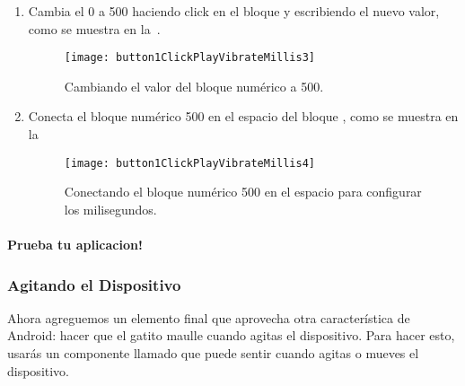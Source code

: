 \begin{enumerate}
\item Cambia el 0 a 500 haciendo click en el bloque y escribiendo el
  nuevo valor, como se muestra en
  la~.

\begin{figure}[H]
\centering
\texttt{[image: button1ClickPlayVibrateMillis3]}
\caption{Cambiando el valor del bloque numérico a 500.}
\label{fig:button1ClickPlayVibrateMillis3}
\end{figure}

\item Conecta el bloque numérico 500 en el espacio del bloque
  , como se muestra en
  la~

\begin{figure}[H]
\centering
\texttt{[image: button1ClickPlayVibrateMillis4]}
\caption{Conectando el bloque numérico 500 en el espacio para
  configurar los milisegundos.}
\label{fig:button1ClickPlayVibrateMillis4}
\end{figure}

\end{enumerate}

\paragraph{Prueba tu aplicacion!}

\subsubsection*{Agitando el Dispositivo}

Ahora agreguemos un elemento final que aprovecha otra característica
de Android: hacer que el gatito maulle cuando agitas el
dispositivo. Para hacer esto, usarás un componente llamado
 que puede sentir cuando agitas o mueves el
dispositivo.

